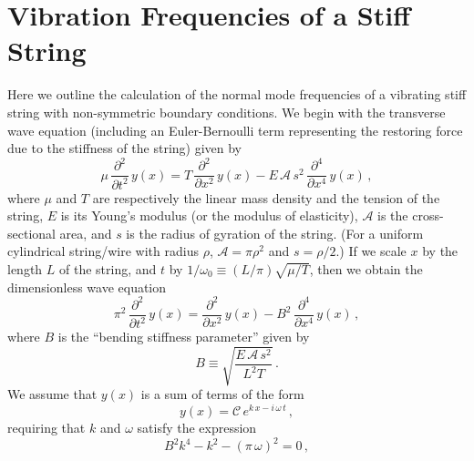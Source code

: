 %
%
%

 \section{Vibration Frequencies of a Stiff String\label{app:freq}}

Here we outline the calculation of the normal mode frequencies of a vibrating stiff string with non-symmetric boundary conditions. We begin with the transverse wave equation (including an Euler-Bernoulli term representing the restoring force due to the stiffness of the string) given by~\cite{ref:fletcher1964nvf}
 \begin{equation}
\mu\, \frac{\partial^2}{\partial t^2}\, y(x) = T\, \frac{\partial^2}{\partial x^2}\, y(x) - E\, \mathcal{A}\, s^2\, \frac{\partial^4}{\partial x^4}\, y (x)\, ,
 \end{equation}
where $\mu$ and $T$ are respectively the linear mass density and the tension of the string, $E$ is its Young's modulus (or the modulus of elasticity), $\mathcal{A}$ is the cross-sectional area, and $s$ is the radius of gyration of the string. (For a uniform cylindrical string/wire with radius $\rho$, $\mathcal{A} = \pi \rho^2$ and $s = \rho/2$.) If we scale $x$ by the length $L$ of the string, and $t$ by $1/\omega_0 \equiv  (L/\pi) \sqrt{\mu/T}$, then we obtain the dimensionless wave equation
 \begin{equation} \label{eqn:wave_eqn_dim}
\pi^2\, \frac{\partial^2}{\partial t^2}\, y(x) = \frac{\partial^2}{\partial x^2}\, y(x) - B^2\, \frac{\partial^4}{\partial x^4}\, y (x)\, ,
 \end{equation}
where $B$ is the ``bending stiffness parameter'' given by
 \begin{equation}
B \equiv \sqrt{\frac{E\, \mathcal{A}\, s^2}{L^2 T}}\, .
 \end{equation}
We assume that $y(x)$ is a sum of terms of the form
 \begin{equation}
y(x) = \mathcal{C}\, e^{k\, x - i\, \omega\, t}\, ,
 \end{equation}
requiring that $k$ and $\omega$ satisfy the expression
 \begin{equation} \label{eqn:kw}
B^2 k^4 - k^2 - (\pi\, \omega)^2 = 0\, ,
 \end{equation}
